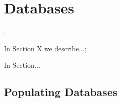 \chapter{Databases}\label{chap:db}
\dummy .

\begin{chapterorganization}
  \item In Section X we describe...;
  \item In Section...
\end{chapterorganization}

\section{Populating Databases}
\dummy